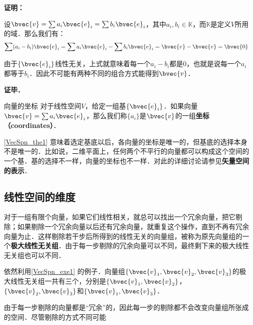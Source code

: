 \textbf{证明：}

设$\bvec{v}=\sum a_i\bvec{e}_i=\sum b_i\bvec{e}_i$，其中$a_i, b_i\in \mathbb{K}$，而$\mathbb{K}$是定义$V$所用的域．那么我们有：
\begin{equation}
\sum(a_i-b_i)\bvec{e}_i=\sum a_i\bvec{e}_i-\sum b_i\bvec{e}_i=\bvec{v}-\bvec{v}=\bvec{0}
\end{equation}

由于$\{\bvec{e}_i\}$线性无关，上式就意味着每一个$a_i-b_i$都是$0$，也就是说每一个$a_i$都等于$b_i$．因此不可能有两种不同的组合方式能得到$\bvec{v}$．

\textbf{证毕．}

\begin{definition}{向量的坐标}
对于线性空间$V$，给定一组基$\{\bvec{e}_i\}$．如果向量$\bvec{v}=\sum a_i\bvec{e}_i$，那么我们称$\{a_i\}$是$\bvec{v}$的一组\textbf{坐标（coordinates）}．
\end{definition}

\autoref{VecSpn_the1} 意味着选定基底以后，各向量的坐标是唯一的，但基底的选择本身不是唯一的．比如说，二维平面上，任何两个不平行的向量都可以构成这个空间的一个基．基的选择不一样，向量的坐标也不一样．对此的详细讨论请参见\textbf{矢量空间的表示}．

\subsection{线性空间的维度}

对于一组有限个向量，如果它们线性相关，就总可以找出一个冗余向量，把它剔除；如果剔除一个冗余向量以后还有冗余向量，就重复这个操作，直到不再有冗余向量为止．这样剔除若干步后所得到的线性无关的向量组，被称为原先向量组的一个\textbf{极大线性无关组}．由于每一步剔除的冗余向量可以不同，最终剩下来的极大线性无关组也可以不同．

\begin{example}{}
依然利用\autoref{VecSpn_exe1} 的例子．向量组$\{\bvec{v}_1, \bvec{v}_2, \bvec{v}_3\}$的极大线性无关组一共有三个，分别是$\{\bvec{v}_1, \bvec{v}_2\}$，$\{\bvec{v}_2, \bvec{v}_3\}$和$\{\bvec{v}_1, \bvec{v}_3\}$．
\end{example}

由于每一步剔除的向量都是“冗余”的，因此每一步的剔除都不会改变向量组所张成的空间．尽管剔除的方式不同可能





